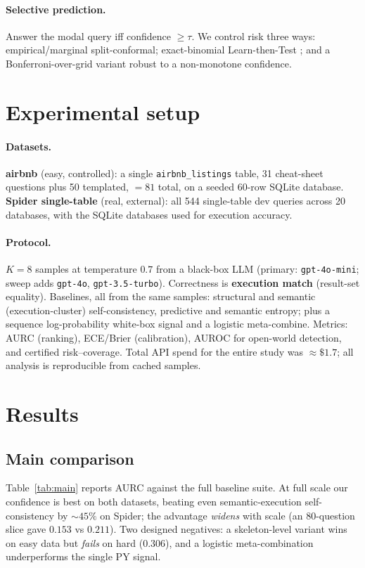 \documentclass[11pt]{article}
\begin{document}
\paragraph{Selective prediction.} Answer the modal query iff confidence $\ge\tau$. We control risk
three ways: empirical/marginal split-conformal; exact-binomial Learn-then-Test
\citep{angelopoulos2021ltt}; and a Bonferroni-over-grid variant robust to a non-monotone confidence.

\section{Experimental setup}\label{sec:exp}

\paragraph{Datasets.} \textbf{airbnb} (easy, controlled): a single \texttt{airbnb\_listings} table,
31 cheat-sheet questions plus 50 templated, $=81$ total, on a seeded 60-row SQLite database.
\textbf{Spider single-table} (real, external): all 544 single-table dev queries across 20 databases,
with the SQLite databases used for execution accuracy.

\paragraph{Protocol.} $K=8$ samples at temperature $0.7$ from a black-box LLM (primary:
\texttt{gpt-4o-mini}; sweep adds \texttt{gpt-4o}, \texttt{gpt-3.5-turbo}). Correctness is
\textbf{execution match} (result-set equality). Baselines, all from the same samples: structural and
semantic (execution-cluster) self-consistency, predictive and semantic entropy; plus a sequence
log-probability white-box signal and a logistic meta-combine. Metrics: AURC (ranking), ECE/Brier
(calibration), AUROC for open-world detection, and certified risk--coverage. Total API spend for the
entire study was $\approx\$1.7$; all analysis is reproducible from cached samples.

\section{Results}\label{sec:results}

\subsection{Main comparison}\label{sec:main}
Table~\ref{tab:main} reports AURC against the full baseline suite. At full scale our confidence is
best on both datasets, beating even semantic-execution self-consistency by ${\sim}45\%$ on Spider;
the advantage \emph{widens} with scale (an 80-question slice gave $0.153$ vs $0.211$). Two designed
negatives: a skeleton-level variant wins on easy data but \emph{fails} on hard ($0.306$), and a
logistic meta-combination underperforms the single PY signal.
\end{document}
